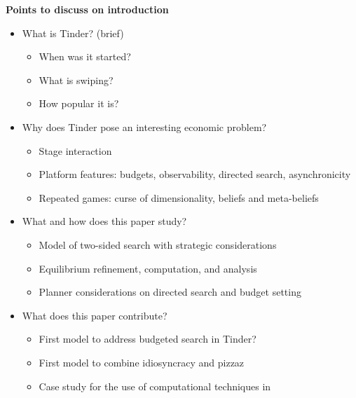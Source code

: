 \textbf{Points to discuss on introduction}
\begin{itemize}
    \item What is Tinder? (brief)
    \begin{itemize}
        \item When was it started?
        \item What is swiping?
        \item How popular it is?
    \end{itemize}
    \item Why does Tinder pose an interesting economic problem?
    \begin{itemize}
        \item Stage interaction
        \item Platform features: budgets, observability, directed search, asynchronicity
        \item Repeated games: curse of dimensionality, beliefs and meta-beliefs
    \end{itemize}
    \item What and how does this paper study?
    \begin{itemize}
        \item Model of two-sided search with strategic considerations
        \item Equilibrium refinement, computation, and analysis
        \item Planner considerations on directed search and budget setting
    \end{itemize}
    \item What does this paper contribute?
    \begin{itemize}
        \item First model to address budgeted search in Tinder?
        \item First model to combine idiosyncracy and pizzaz
        \item Case study for the use of computational techniques in 
    \end{itemize}
\end{itemize}
